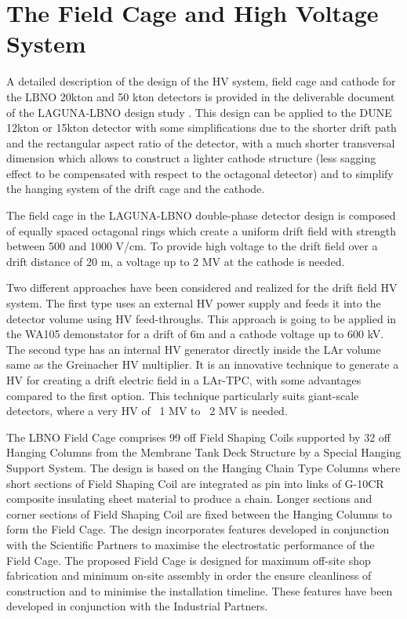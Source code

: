 \section{The Field Cage and High Voltage System} 
\label{sec:detectors-fd-alt-hv}

A detailed description of the design of the HV system, field cage and cathode for the LBNO 20kton and 50 kton detectors is provided in the deliverable document of the LAGUNA-LBNO design study \cite{LAGUNA-LBNO-deliv}. This design can be applied to the DUNE 12kton or 15kton detector with some simplifications due to the shorter drift path and the rectangular aspect ratio of the detector, with a much shorter transversal dimension which allows to construct a lighter cathode structure (less sagging effect to be compensated with respect to the octagonal detector) and to simplify the hanging system of the drift cage and the cathode.

The field cage in the LAGUNA-LBNO double-phase detector design  is composed of equally spaced octagonal rings which create a uniform drift field with strength between 500 and 1000 V/cm. To provide high voltage to the drift field over a drift distance of 20 m, a voltage up to 2 MV at the cathode is needed. 

Two different approaches have been considered and realized for the drift field HV system. The first type uses an external HV power supply and feeds it into the detector volume using HV feed-throughs. This approach is going to be applied in the WA105 demonstator for a drift of 6m and a cathode voltage up to 600 kV.  The second type has an internal HV generator directly inside the LAr volume same as the Greinacher HV multiplier. It is an innovative technique to generate a HV for creating a drift electric field in a LAr-TPC, with some advantages compared to the first option. This technique particularly suits giant-scale detectors, where a very HV of ~1 MV to ~2 MV is needed.

The LBNO Field Cage comprises 99 off Field Shaping Coils supported by 32 off Hanging Columns from the Membrane Tank Deck Structure by a Special Hanging Support System.  The design is based on the Hanging Chain Type Columns where short sections of Field Shaping Coil are integrated as pin into links of G-10CR composite insulating sheet material to produce a chain.  Longer sections and corner sections of Field Shaping Coil are fixed between the Hanging Columns to form the Field Cage.  The design incorporates features developed in conjunction with the Scientific Partners to maximise the electrostatic performance of the Field Cage. The proposed Field Cage is designed for maximum off-site shop fabrication and minimum on-site assembly in order the ensure cleanliness of construction and to minimise the installation timeline.  These features have been developed in conjunction with the Industrial Partners.


